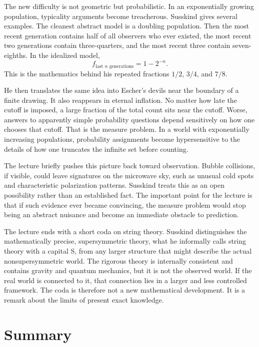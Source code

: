 The new difficulty is not geometric but probabilistic. In an exponentially growing population, typicality arguments become treacherous. Susskind gives several examples. The cleanest abstract model is a doubling population. Then the most recent generation contains half of all observers who ever existed, the most recent two generations contain three-quarters, and the most recent three contain seven-eighths. In the idealized model,
\begin{equation}
f_{\text{last }n\text{ generations}}=1-2^{-n}.
\end{equation}
This is the mathematics behind his repeated fractions \(1/2\), \(3/4\), and \(7/8\).

He then translates the same idea into Escher's devils near the boundary of a finite drawing. It also reappears in eternal inflation. No matter how late the cutoff is imposed, a large fraction of the total count sits near the cutoff. Worse, answers to apparently simple probability questions depend sensitively on how one chooses that cutoff. That is the measure problem. In a world with exponentially increasing populations, probability assignments become hypersensitive to the details of how one truncates the infinite set before counting.

The lecture briefly pushes this picture back toward observation. Bubble collisions, if visible, could leave signatures on the microwave sky, such as unusual cold spots and characteristic polarization patterns. Susskind treats this as an open possibility rather than an established fact. The important point for the lecture is that if such evidence ever became convincing, the measure problem would stop being an abstract nuisance and become an immediate obstacle to prediction.

The lecture ends with a short coda on string theory. Susskind distinguishes the mathematically precise, supersymmetric theory, what he informally calls string theory with a capital S, from any larger structure that might describe the actual nonsupersymmetric world. The rigorous theory is internally consistent and contains gravity and quantum mechanics, but it is not the observed world. If the real world is connected to it, that connection lies in a larger and less controlled framework. The coda is therefore not a new mathematical development. It is a remark about the limits of present exact knowledge.

\section{Summary}

